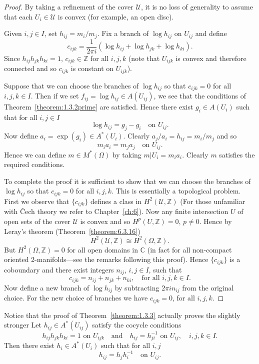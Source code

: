 \begin{proof}
By taking a refinement of the cover $\mathcal U$, it is no loss of generality to assume that each $U_i\in\mathcal U$ is convex (for example, an open disc).

Given $i,j\in I$, set $h_{ij}=m_i/m_j$. Fix a branch of $\log h_{ij}$ on $U_{ij}$ and define
\[ c_{ijk}=\frac{1}{2\pi i}(\log h_{ij}+\log h_{jk}+\log h_{ki}). \]
Since $h_{ij}h_{jk}h_{ki}=1$, $c_{ijk}\in\mathbb Z$ for all $i,j,k$ (note that $U_{ijk}$ is convex and therefore connected and so $c_{ijk}$ is constant on $U_{ijk}$).

Suppose that we can choose the branches of $\log h_{ij}$ so that $c_{ijk}=0$ for all $i,j,k\in I$. Then if we set $f_{ij}=\log h_{ij}\in A(U_{ij})$, we see that the conditions of Theorem~\ref{theorem:1.3.2prime} are satisfied. Hence there exist $g_i\in A(U_i)$ such that for all $i,j\in I$
\[ \log h_{ij}=g_j-g_i\quad\text{on }U_{ij}. \]
Now define $a_i=\exp(g_i)\in A^*(U_i)$. Clearly $a_j/a_i=h_{ij}=m_i/m_j$ and so
\[ m_i a_i=m_j a_j\quad\text{on }U_{ij}. \]
Hence we can define $m\in M^*(\Omega)$ by taking $m|U_i=m_i a_i$. Clearly $m$ satisfies the required conditions.

To complete the proof it is sufficient to show that we can choose the branches of $\log h_{ij}$ so that $c_{ijk}=0$ for all $i,j,k$. This is essentially a topological problem. First we observe that $\{c_{ijk}\}$ defines a class in $H^2(\mathcal U,\mathbb Z)$ (For those unfamiliar with \v Cech theory we refer to Chapter~\ref{ch:6}). Now any finite intersection $U$ of open sets of the cover $\mathcal U$ is convex and so $H^p(U,\mathbb Z)=0$, $p\ne0$. Hence by Leray's theorem (Theorem~\ref{theorem:6.3.16})
\[ H^2(\mathcal U,\mathbb Z)\cong H^2(\Omega,\mathbb Z). \]
But $H^2(\Omega,\mathbb Z)=0$ for all open domains in $\mathbb C$ (in fact for all non-compact oriented 2-manifolds---see the remarks following this proof). Hence $\{c_{ijk}\}$ is a coboundary and there exist integers $n_{ij}$, $i,j\in I$, such that
\[ c_{ijk}=n_{ij}+n_{jk}+n_{ki},\quad\text{for all }i,j,k\in I. \]
Now define a new branch of $\log h_{ij}$ by subtracting $2\pi i n_{ij}$ from the original choice. For the new choice of branches we have $c_{ijk}=0$, for all $i,j,k$.
\end{proof}
Notice that the proof of Theorem~\ref{theorem:1.3.3} actually proves the slightly stronger
 Let $h_{ij}\in A^*(U_{ij})$ satisfy the cocycle conditions
\[ h_{ij}h_{jk}h_{ki}=1\text{ on }U_{ijk}\quad\text{and}\quad h_{ij}=h_{ji}^{-1}\text{ on }U_{ij},\quad i,j,k\in I. \]
Then there exist $h_i\in A^*(U_i)$ such that for all $i,j$
\[ h_{ij}=h_jh_i^{-1}\quad\text{on }U_{ij}. \]
